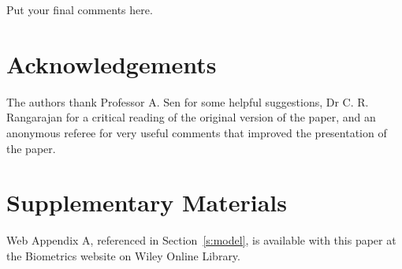 \documentclass[useAMS,referee]{biom}
\begin{document}
Put your final comments here. 


\backmatter


\section*{Acknowledgements}

The authors thank Professor A. Sen for some helpful suggestions,
Dr C. R. Rangarajan for a critical reading of the original version of the
paper, and an anonymous referee for very useful comments that improved
the presentation of the paper.\vspace*{-8pt}


\section*{Supplementary Materials}

Web Appendix A, referenced in Section~\ref{s:model}, is available with
this paper at the Biometrics website on Wiley Online
Library.\vspace*{-8pt}


%
%   
% 
\end{document}
